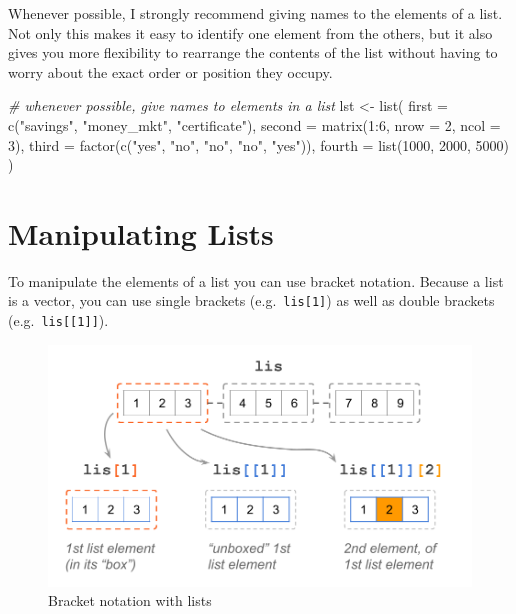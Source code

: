 \documentclass[
]{book}
\newenvironment{Shaded}{\begin{snugshade}}{\end{snugshade}}
\newcommand{\AttributeTok}[1]{\textcolor[rgb]{0.77,0.63,0.00}{#1}}
\newcommand{\CommentTok}[1]{\textcolor[rgb]{0.56,0.35,0.01}{\textit{#1}}}
\newcommand{\DecValTok}[1]{\textcolor[rgb]{0.00,0.00,0.81}{#1}}
\newcommand{\FunctionTok}[1]{\textcolor[rgb]{0.00,0.00,0.00}{#1}}
\newcommand{\NormalTok}[1]{#1}
\newcommand{\OtherTok}[1]{\textcolor[rgb]{0.56,0.35,0.01}{#1}}
\newcommand{\SpecialCharTok}[1]{\textcolor[rgb]{0.00,0.00,0.00}{#1}}
\newcommand{\StringTok}[1]{\textcolor[rgb]{0.31,0.60,0.02}{#1}}
\begin{document}
Whenever possible, I strongly recommend giving names to the elements of a list.
Not only this makes it easy to identify one element from the others, but it also
gives you more flexibility to rearrange the contents of the list without having
to worry about the exact order or position they occupy.

\begin{Shaded}
\begin{Highlighting}[]
\CommentTok{\# whenever possible, give names to elements in a list}
\NormalTok{lst }\OtherTok{\textless{}{-}} \FunctionTok{list}\NormalTok{(}
  \AttributeTok{first =} \FunctionTok{c}\NormalTok{(}\StringTok{"savings"}\NormalTok{, }\StringTok{"money\_mkt"}\NormalTok{, }\StringTok{"certificate"}\NormalTok{),}
  \AttributeTok{second =} \FunctionTok{matrix}\NormalTok{(}\DecValTok{1}\SpecialCharTok{:}\DecValTok{6}\NormalTok{, }\AttributeTok{nrow =} \DecValTok{2}\NormalTok{, }\AttributeTok{ncol =} \DecValTok{3}\NormalTok{),}
  \AttributeTok{third =} \FunctionTok{factor}\NormalTok{(}\FunctionTok{c}\NormalTok{(}\StringTok{"yes"}\NormalTok{, }\StringTok{"no"}\NormalTok{, }\StringTok{"no"}\NormalTok{, }\StringTok{"no"}\NormalTok{, }\StringTok{"yes"}\NormalTok{)),}
  \AttributeTok{fourth =} \FunctionTok{list}\NormalTok{(}\DecValTok{1000}\NormalTok{, }\DecValTok{2000}\NormalTok{, }\DecValTok{5000}\NormalTok{)}
\NormalTok{)}
\end{Highlighting}
\end{Shaded}

\hypertarget{manipulating-lists}{%
\section{Manipulating Lists}\label{manipulating-lists}}

To manipulate the elements of a list you can use bracket notation. Because a
list is a vector, you can use single brackets (e.g.~\texttt{lis{[}1{]}}) as well as
double brackets (e.g.~\texttt{lis{[}{[}1{]}{]}}).

\begin{figure}

{\centering \includegraphics[width=0.75\linewidth]{images/objects/obj-list-brackets1} 

}

\caption{Bracket notation with lists}\label{fig:unnamed-chunk-147}
\end{figure}
\end{document}
